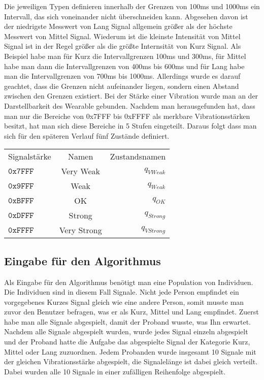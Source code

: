 Die jeweiligen Typen definieren innerhalb der Grenzen von 100ms und 1000ms ein Intervall, das sich voneinander nicht {\"u}berschneiden kann. Abgesehen davon ist der niedrigste Messwert von Lang Signal allgemein gr{\"o}{\ss}er als der h{\"o}chste Messwert von Mittel Signal. Wiederum ist die kleinste Intensit{\"a}t von Mittel Signal ist in der Regel gr{\"o}{\ss}er als die gr{\"o}{\ss}te Internsit{\"a}t von Kurz Signal. Als Beispiel habe man f{\"u}r Kurz die Intervallgrenzen 100ms und 300ms, f{\"u}r Mittel habe man dann die Intervallgrenzen von 400ms bis 600ms und f{\"u}r Lang habe man die Intervallgrenzen von 700ms bis 1000ms. 
Allerdings wurde es darauf geachtet, dass die Grenzen nicht aufeinander liegen, sondern einen Abstand zwischen den Grenzen existiert. Bei der St{\"a}rke einer Vibration wurde man an der Darstellbarkeit des Wearable gebunden. Nachdem man herausgefunden hat, dass man nur die Bereiche von 0x7FFF bis 0xFFFF als merkbare Vibrationsst{\"a}rken besitzt, hat man sich diese Bereiche in 5 Stufen eingeteilt. Daraus folgt dass man sich f{\"u}r den sp{\"a}teren Verlauf f{\"u}nf Zust{\"a}nde definiert. 

\begin{tabular}{lcr}
  Signalst{\"a}rke & Namen & Zustandsnamen \\
  $\mathtt{0x7FFF}$ & Very Weak & $q_{VWeak}$ \\
  $\mathtt{0x9FFF}$ & Weak & $q_{Weak}$ \\
  $\mathtt{0xBFFF}$ & OK & $q_{OK}$ \\
  $\mathtt{0xDFFF}$ & Strong & $q_{Strong}$ \\
  $\mathtt{0xFFFF}$ & Very Strong & $q_{VStrong}$ \\
\end{tabular}

\subsection{Eingabe f{\"u}r den Algorithmus}
Als Eingabe f{\"u}r den Algorithmus ben{\"o}tigt man eine Population von Individuen. Die Individuen sind in diesem Fall Signale. 
Nicht jede Person empfindet ein vorgegebenes Kurzes Signal gleich wie eine andere Person, somit musste man zuvor den Benutzer befragen, was er als Kurz, Mittel und Lang empfindet. Zuerst habe man alle Signale abgespielt, damit der Proband wusste, was Ihn erwartet. 
Nachdem alle Signale abgespielt wurden, wurde jedes Signal einzeln abgespielt und der Proband hatte die Aufgabe das abgespielte Signal der Kategorie Kurz, Mittel oder Lang zuzuordnen. 
Jedem Probanden wurde insgesamt 10 Signale mit der gleichen Vibrationsst{\"a}rke abgespielt, die Signalel{\"a}nge ist dabei gleich verteilt.
Dabei wurden alle 10 Signale in einer zuf{\"a}lligen Reihenfolge abgespielt.

